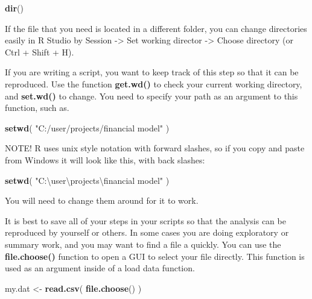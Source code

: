 \documentclass[]{book}
\newenvironment{Shaded}{\begin{snugshade}}{\end{snugshade}}
\newcommand{\CharTok}[1]{\textcolor[rgb]{0.31,0.60,0.02}{#1}}
\newcommand{\KeywordTok}[1]{\textcolor[rgb]{0.13,0.29,0.53}{\textbf{#1}}}
\newcommand{\NormalTok}[1]{#1}
\newcommand{\StringTok}[1]{\textcolor[rgb]{0.31,0.60,0.02}{#1}}
\theoremstyle{definition}
\theoremstyle{definition}
\theoremstyle{definition}
\theoremstyle{remark}
\begin{document}
\begin{Shaded}
\begin{Highlighting}[]
\KeywordTok{dir}\NormalTok{()}
\end{Highlighting}
\end{Shaded}

If the file that you need is located in a different folder, you can
change directories easily in R Studio by Session -\textgreater{} Set
working director -\textgreater{} Choose directory (or Ctrl + Shift + H).

If you are writing a script, you want to keep track of this step so that
it can be reproduced. Use the function \textbf{get.wd()} to check your
current working directory, and \textbf{set.wd()} to change. You need to
specify your path as an argument to this function, such as.

\begin{Shaded}
\begin{Highlighting}[]
\KeywordTok{setwd}\NormalTok{( }\StringTok{"C:/user/projects/financial model"}\NormalTok{ )}
\end{Highlighting}
\end{Shaded}

NOTE! R uses unix style notation with forward slashes, so if you copy
and paste from Windows it will look like this, with back slashes:

\begin{Shaded}
\begin{Highlighting}[]
\KeywordTok{setwd}\NormalTok{( }\StringTok{"C:\textbackslash{}user\textbackslash{}projects}\CharTok{\textbackslash{}f}\StringTok{inancial model"}\NormalTok{ )}
\end{Highlighting}
\end{Shaded}

You will need to change them around for it to work.

It is best to save all of your steps in your scripts so that the
analysis can be reproduced by yourself or others. In some cases you are
doing exploratory or summary work, and you may want to find a file a
quickly. You can use the \textbf{file.choose()} function to open a GUI
to select your file directly. This function is used as an argument
inside of a load data function.

\begin{Shaded}
\begin{Highlighting}[]
\NormalTok{my.dat <-}\StringTok{ }\KeywordTok{read.csv}\NormalTok{( }\KeywordTok{file.choose}\NormalTok{() )}
\end{Highlighting}
\end{Shaded}
\end{document}
